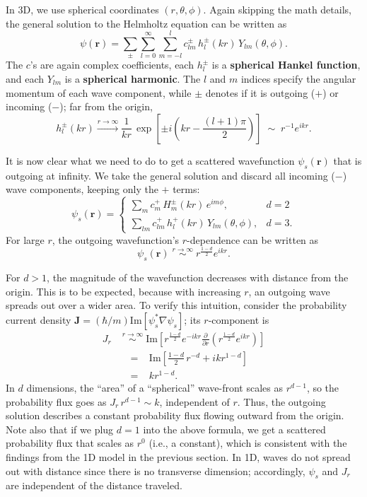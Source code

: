 \documentclass[pra,12pt]{revtex4}
\begin{document}
In 3D, we use spherical coordinates $(r,\theta,\phi)$.  Again skipping
the math details, the general solution to the Helmholtz equation can
be written as
$$\psi(\mathbf{r})=\sum_{\pm}\sum_{l=0}^\infty\sum_{m=-l}^lc_{lm}^\pm\,h_l^\pm(kr)\,Y_{lm}(\theta,\phi).$$
The $c$'s are again complex coefficients, each $h_l^\pm$ is a
\textbf{spherical Hankel function}, and each $Y_{lm}$ is a
\textbf{spherical harmonic}.  The $l$ and $m$ indices specify the
angular momentum of each wave component, while $\pm$ denotes if it is
outgoing ($+$) or incoming ($-$); far from the origin,
$$h_l^\pm(kr) \overset{r\rightarrow\infty}{\longrightarrow} \frac{1}{kr}\,\exp\left[\pm i\left(kr-\frac{(l+1)\pi}{2}\right)\right] \;\sim\; r^{-1} e^{ikr}.$$

It is now clear what we need to do to get a scattered wavefunction
$\psi_s(\mathbf{r})$ that is outgoing at infinity.  We take the
general solution and discard all incoming ($-$) wave components,
keeping only the $+$ terms:
$$\psi_s(\mathbf{r}) = \begin{cases} \displaystyle\sum_{m} c_m^+\,H_m^\pm(kr)\,e^{im\phi}, &d=2\\ \displaystyle\sum_{lm} c_{lm}^+\,h_l^+(kr)\,Y_{lm}(\theta,\phi),&d=3.\end{cases}$$
For large $r$, the outgoing wavefunction's $r$-dependence can be
written as
$$\psi_s(\mathbf{r}) \; \overset{r\rightarrow\infty}{\sim} \; r^{\frac{1-d}{2}} e^{ikr}.$$

For $d > 1$, the magnitude of the wavefunction decreases with distance
from the origin.  This is to be expected, because with increasing $r$,
an outgoing wave spreads out over a wider area.  To verify this
intuition, consider the probability current density
$\mathbf{J} = (\hbar/m) \mathrm{Im}\left[\psi_s^*\nabla\psi_s\right]$;
its $r$-component is
$$\begin{aligned}J_r \; &\overset{r\rightarrow\infty}{\sim} \; \mathrm{Im}\left[r^{\frac{1-d}{2}} e^{-ikr} \frac{\partial}{\partial r}\left(r^{\frac{1-d}{2}} e^{ikr}\right)\right] \\ &\;\;=\;\;\;\mathrm{Im}\left[\frac{1-d}{2}\, r^{-d} + ik r^{1-d}\right]\\ &\;\;=\;\;\; kr^{1-d}.\end{aligned}$$
In $d$ dimensions, the ``area'' of a ``spherical'' wave-front scales
as $r^{d-1}$, so the probability flux goes as $J_r \,r^{d-1} \sim k$,
independent of $r$.  Thus, the outgoing solution describes a constant
probability flux flowing outward from the origin.  Note also that if
we plug $d=1$ into the above formula, we get a scattered probability
flux that scales as $r^0$ (i.e., a constant), which is consistent
with the findings from the 1D model in the previous section.
In 1D, waves do not spread out with distance since there is no
transverse dimension; accordingly, $\psi_s$ and $J_r$ are independent
of the distance traveled.
\end{document}
